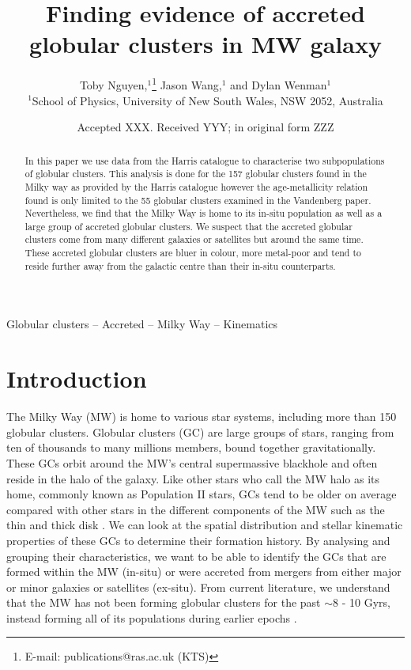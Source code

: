 \documentclass[fleqn,usenatbib]{mnras}
\title[Short title, max. 45 characters]{Finding evidence of accreted globular clusters in MW galaxy}
\author[T. Nguyen]{
Toby Nguyen,$^{1}$\thanks{E-mail: publications@ras.ac.uk (KTS)}
Jason Wang,$^{1}$
and Dylan Wenman$^{1}$
\\
$^{1}$School of Physics, University of New South Wales, NSW 2052, Australia\\
}
\date{Accepted XXX. Received YYY; in original form ZZZ}
\begin{document}
\label{firstpage}
\pagerange{\pageref{firstpage}--\pageref{lastpage}}
\maketitle

\begin{abstract}
In this paper we use data from the Harris catalogue to characterise two subpopulations of globular 
clusters. This analysis is done for the 157 globular clusters found in the Milky way as provided 
by the Harris catalogue however the age-metallicity relation found is only limited to the 55 globular 
clusters examined in the Vandenberg paper. Nevertheless, we find that the Milky Way is home to its 
in-situ population as well as a large group of accreted globular clusters. We suspect that the 
accreted globular clusters come from many different galaxies or satellites but around the same 
time. These accreted globular clusters are bluer in colour, more metal-poor and tend to reside 
further away from the galactic centre than their in-situ counterparts.
\end{abstract}

\begin{keywords}
Globular clusters -- Accreted -- Milky Way -- Kinematics
\end{keywords}

\section{Introduction}

The Milky Way (MW) is home to various star systems, including more than 150 globular clusters.
Globular clusters (GC) are large groups of stars, ranging from ten of thousands to many 
millions members, bound together gravitationally. These GCs orbit around the MW's central 
supermassive blackhole and often reside in the halo of the galaxy. Like other stars who call 
the MW halo as its home, commonly known as Population II stars, GCs tend to be older on average 
compared with other stars in the different components of the MW such as the thin and thick disk \citep{Massari_2019}.
We can look at the spatial distribution and stellar kinematic properties of these GCs to determine 
their formation history. By analysing and grouping their characteristics, we want to be able to 
identify the GCs that are formed within the MW (in-situ) or were accreted from mergers from either 
major or minor galaxies or satellites (ex-situ). From current literature, we understand that the MW 
has not been forming globular clusters for the past $\sim$8 - 10 Gyrs, instead forming all of its 
populations during earlier epochs \citep{belokurov2023insituvsaccretedmilky}.
\end{document}
